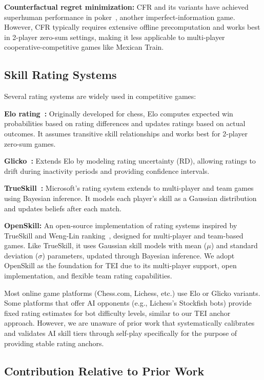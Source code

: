 \documentclass[11pt,letterpaper]{article}
\begin{document}
\textbf{Counterfactual regret minimization:} CFR and its variants have achieved superhuman performance in poker~\cite{bowling2015heads}, another imperfect-information game. However, CFR typically requires extensive offline precomputation and works best in 2-player zero-sum settings, making it less applicable to multi-player cooperative-competitive games like Mexican Train.

\subsection{Skill Rating Systems}

Several rating systems are widely used in competitive games:

\textbf{Elo rating~\cite{elo1978rating}:} Originally developed for chess, Elo computes expected win probabilities based on rating differences and updates ratings based on actual outcomes. It assumes transitive skill relationships and works best for 2-player zero-sum games.

\textbf{Glicko~\cite{glickman1999glicko}:} Extends Elo by modeling rating uncertainty (RD), allowing ratings to drift during inactivity periods and providing confidence intervals.

\textbf{TrueSkill~\cite{herbrich2006trueskill}:} Microsoft's rating system extends to multi-player and team games using Bayesian inference. It models each player's skill as a Gaussian distribution and updates beliefs after each match.

\textbf{OpenSkill:} An open-source implementation of rating systems inspired by TrueSkill and Weng-Lin ranking~\cite{wenglin2011}, designed for multi-player and team-based games. Like TrueSkill, it uses Gaussian skill models with mean ($\mu$) and standard deviation ($\sigma$) parameters, updated through Bayesian inference. We adopt OpenSkill as the foundation for TEI due to its multi-player support, open implementation, and flexible team rating capabilities.

Most online game platforms (Chess.com, Lichess, etc.) use Elo or Glicko variants. Some platforms that offer AI opponents (e.g., Lichess's Stockfish bots) provide fixed rating estimates for bot difficulty levels, similar to our TEI anchor approach. However, we are unaware of prior work that systematically calibrates and validates AI skill tiers through self-play specifically for the purpose of providing stable rating anchors.

\subsection{Contribution Relative to Prior Work}
\end{document}
